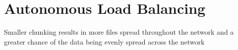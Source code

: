 \chapter{Autonomous Load Balancing}
\label{chapter:auto-balance}

Smaller chunking results in more files spread throughout the  network and a greater chance of the data being evenly spread across the network 